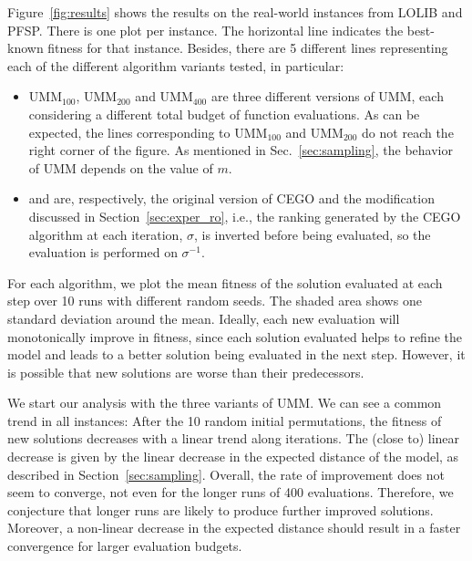 \documentclass[sigconf,dvipsnames]{acmart}
\begin{document}
Figure~\ref{fig:results} shows the results on the real-world instances from
LOLIB and PFSP.  There is one plot per instance.  The horizontal line indicates
the best-known fitness for that instance.  Besides, there are 5 different lines
representing each of the different algorithm variants tested, in particular:
\begin{itemize}
\item UMM$_{100}$, UMM$_{200}$ and UMM$_{400}$ are three different versions of UMM, each considering a different total budget of function evaluations. As can be expected, the lines corresponding to UMM$_{100}$ and UMM$_{200}$ do not reach the right corner of the figure. As mentioned in Sec.~\ref{sec:sampling}, the behavior of
UMM depends on the value of $m$. 
\item \CEGOorig and \CEGOinv are, respectively, the original version of CEGO and the modification discussed in Section~\ref{sec:exper_ro}, i.e., the ranking generated by the CEGO algorithm at each iteration, $\sigma$, is inverted before being evaluated, so the evaluation is performed on $\sigma^{-1}$. 
\end{itemize}
For each algorithm, we plot the mean
fitness of the solution evaluated at each step over 10 runs with different
random seeds.
% 
The shaded area shows one standard deviation around the mean. Ideally, each new
evaluation will monotonically improve in fitness, since each solution evaluated
helps to refine the model and leads to a better solution being evaluated in the
next step.  However, it is possible that new solutions are worse than their
predecessors. %

 We start our analysis with the three
variants of UMM. We can see a common trend in all instances: After
the 10 random initial permutations, the fitness of new solutions decreases
with a linear trend along iterations. The (close to) linear decrease is given
by the linear decrease in the expected distance of the model, as described in Section~\ref{sec:sampling}. Overall, the rate of improvement
does not seem to converge, not even for the longer runs of 400 evaluations. Therefore, we conjecture that longer runs are likely to produce further improved solutions. Moreover, a non-linear decrease in the expected distance should result in a faster convergence for larger evaluation budgets. 
\end{document}
